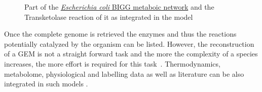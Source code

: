       \begin{figure}
         \hspace*{-1.75in}

         \caption[Part of the \textit{Escherichia coli} metaboic network and the Transketolase reaction]{
            Part of the \href{http://bigg.ucsd.edu/static/models/e_coli_core.xml}{\textit{Escherichia coli} BIGG metaboic network}  
            and the Transketolase reaction of it as integrated in the model}
         \label{fig:met_net}
      \end{figure}


      Once the complete genome is retrieved the enzymes and thus the reactions potentially 
      catalyzed by the organism can be listed. 
      However, the reconstruction of a GEM is not a straight forward task 
      and the more the complexity of a species increases, 
      the more effort is required for this task~\citep{thiele2010protocol}. 
      Thermodynamics, metabolome, physiological 
      and labelling data as well as literature can be also integrated in such models \citep{saldida2020unbiased}. 

